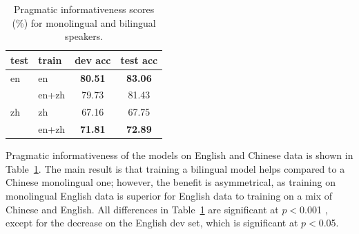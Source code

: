 \documentclass[11pt,a4paper]{article}
\renewcommand{\|}{\mid}
\newcommand{\tabref}[1]{Table~\ref{#1}}
\begin{document}
\begin{table}[t]
\centering
\begin{tabular}{llcc}
\toprule
test & train & dev acc & test acc \\
\midrule
en     & en    & \textbf{80.51} & \textbf{83.06} \\
       & en+zh & 79.73          & 81.43 \\ %
\midrule
zh     & zh    & 67.16          & 67.75 \\
       & en+zh & \textbf{71.81} & \textbf{72.89} \\ %
\bottomrule
\end{tabular}
\caption{Pragmatic informativeness scores (\%) for monolingual and bilingual speakers.}
\label{tab:accuracy}
\end{table}

Pragmatic informativeness of the models on English and Chinese data is shown in \tabref{tab:accuracy}. The main result is that training a
bilingual model helps compared to a Chinese monolingual one; however, the benefit is asymmetrical, as training on monolingual English data is superior for English data to training on a mix of
Chinese and English. All differences in \tabref{tab:accuracy} are significant at $p < {}$0.001 \citep[approximate permutation test, 10,000 samples;][]{Pado2006}, except for the
decrease on the English dev set, which is significant at $p < {}$0.05.

\end{document}
